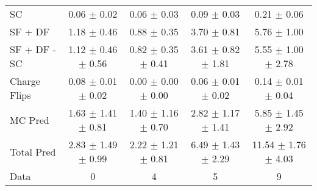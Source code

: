 \begin{tabular}{l|cccc}
                                 SC &  0.06 $\pm$  0.02 &  0.06 $\pm$  0.03 &  0.09 $\pm$  0.03 &  0.21 $\pm$  0.06 \\
                            SF + DF &  1.18 $\pm$  0.46 &  0.88 $\pm$  0.35 &  3.70 $\pm$  0.81 &  5.76 $\pm$  1.00 \\
\hline
                       SF + DF - SC &  1.12 $\pm$  0.46 $\pm$  0.56 &  0.82 $\pm$  0.35 $\pm$  0.41 &  3.61 $\pm$  0.82 $\pm$  1.81 &  5.55 $\pm$  1.00 $\pm$  2.78 \\
\hline\hline
                       Charge Flips &  0.08 $\pm$  0.01 $\pm$  0.02 &  0.00 $\pm$  0.00 $\pm$  0.00 &  0.06 $\pm$  0.01 $\pm$  0.02 &  0.14 $\pm$  0.01 $\pm$  0.04 \\
\hline
                            MC Pred &  1.63 $\pm$  1.41 $\pm$  0.81 &  1.40 $\pm$  1.16 $\pm$  0.70 &  2.82 $\pm$  1.17 $\pm$  1.41 &  5.85 $\pm$  1.45 $\pm$  2.92 \\
\hline
                         Total Pred &  2.83 $\pm$  1.49 $\pm$  0.99 &  2.22 $\pm$  1.21 $\pm$  0.81 &  6.49 $\pm$  1.43 $\pm$  2.29 & 11.54 $\pm$  1.76 $\pm$  4.03 \\
\hline\hline
                               Data &     0 &     4 &     5 &     9 \\
\hline\hline
\end{tabular}


